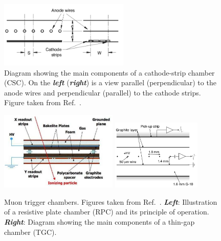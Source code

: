 \begin{figure}[!htb]
    \begin{center}
        \includegraphics[width=0.55\textwidth]{figures/chapter2/muon_spec/csc_chamber}
        \caption{
            Diagram showing the main components of a cathode-strip chamber (CSC).
            On the \textbf{\textit{left}} (\textbf{\textit{right}}) is a view parallel (perpendicular) to the anode
            wires and perpendicular (parallel) to the cathode strips.
            Figure taken from Ref.~\cite{CERN-LHCC-97-022}.
        }
        \label{fig:csc_chamber}
    \end{center}
\end{figure}

\begin{figure}[!htb]
    \begin{center}
        \includegraphics[width=0.5\textwidth]{figures/chapter2/muon_spec/rpc_chamber}
        \includegraphics[width=0.38\textwidth]{figures/chapter2/muon_spec/tgc_chamber}
        \caption{
            Muon trigger chambers. Figures taken from Ref.~\cite{CERN-LHCC-97-022}.
            \textbf{\textit{Left}}: Illustration of a resistive plate chamber (RPC) and its principle of operation.
            \textbf{\textit{Right}}: Diagram showing the main components of a thin-gap chamber (TGC).
        }
        \label{fig:muon_trigger_chamber}
    \end{center}
\end{figure}
